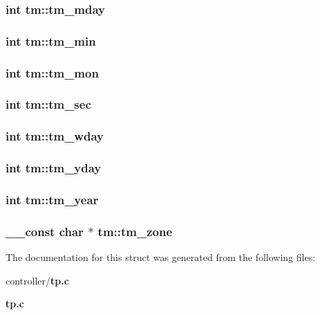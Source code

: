 \subsubsection[{tm\_\-mday}]{\setlength{\rightskip}{0pt plus 5cm}int {\bf tm::tm\_\-mday}}\label{structtm_ab8d8904bad43b0c8b96e61941c5b5310}
\subsubsection[{tm\_\-min}]{\setlength{\rightskip}{0pt plus 5cm}int {\bf tm::tm\_\-min}}\label{structtm_af414eb7c86cc3099595211eee4d4211b}
\subsubsection[{tm\_\-mon}]{\setlength{\rightskip}{0pt plus 5cm}int {\bf tm::tm\_\-mon}}\label{structtm_a112ac36fa2f593777138a417cf031e17}
\subsubsection[{tm\_\-sec}]{\setlength{\rightskip}{0pt plus 5cm}int {\bf tm::tm\_\-sec}}\label{structtm_a4d098a9a5c03a00b2ee61e10851de81e}
\subsubsection[{tm\_\-wday}]{\setlength{\rightskip}{0pt plus 5cm}int {\bf tm::tm\_\-wday}}\label{structtm_afe81a8c46f1c693c43f259b288859f4f}
\subsubsection[{tm\_\-yday}]{\setlength{\rightskip}{0pt plus 5cm}int {\bf tm::tm\_\-yday}}\label{structtm_a93a0ba77cc23796df84405dcbcc57eb1}
\subsubsection[{tm\_\-year}]{\setlength{\rightskip}{0pt plus 5cm}int {\bf tm::tm\_\-year}}\label{structtm_a33adf78fd6476b2120ce3b9c4a852053}
\subsubsection[{tm\_\-zone}]{\setlength{\rightskip}{0pt plus 5cm}\_\-\_\-const char $\ast$ {\bf tm::tm\_\-zone}}\label{structtm_a08f05a87ee67104e5365f706bfa9f705}


The documentation for this struct was generated from the following files:\begin{DoxyCompactItemize}
\item 
controller/{\bf tp.c}\item 
{\bf tp.c}\end{DoxyCompactItemize}
